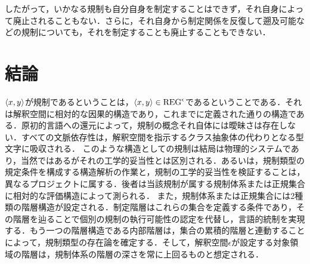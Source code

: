 \noindent したがって，いかなる規制も自分自身を制定することはできず，それ自身によって廃止されることもない．さらに，それ自身から制定関係を反復して遡及可能などの規制についても，それを制定することも廃止することもできない．

\section{結論}
\label{sec:結論}

$ \langle x,y \rangle $が規制であるということは，$ \langle x,y \rangle\in\mathrm{REG}^\epsilon $であるということである．それは解釈空間に相対的な因果的構造であり，これまでに定義された通りの構造である．原初的言語への還元によって，規制の概念それ自体には曖昧さは存在しない．すべての文脈依存性は，解釈空間を指示するクラス抽象体の代わりとなる型文字\kagi{$ \epsilon $}に吸収される．
このような構造としての規制は結局は物理的システムであり，当然ではあるがそれの工学的妥当性とは区別される．あるいは，規制類型の規定条件を構成する構造解析の作業と，規制の工学的妥当性を検証することは，異なるプロジェクトに属する．後者は当該規制が属する規制体系または正規集合に相対的な評価構造によって測られる．
また，規制体系または正規集合には2種類の階層構造が設定される．制定階層はこれらの集合を定義する条件であり，その階層を辿ることで個別の規制の執行可能性の認定を代替し，言語的統制を実現する．もう一つの階層構造である内部階層は，集合の累積的階層と連動することによって，規制類型の存在論を確定する．そして，解釈空間$\epsilon$が設定する対象領域の階層は，規制体系の階層の深さを常に上回るものと想定される．
